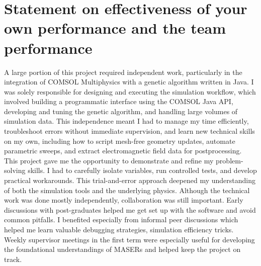 \chapter{
  Statement on effectiveness of your own performance and the team performance
}
A large portion of this project required independent work, particularly in the
integration of COMSOL Multiphysics with a genetic algorithm written in Java. I
was solely responsible for designing and executing the simulation workflow,
which involved building a programmatic interface using the COMSOL Java API,
developing and tuning the genetic algorithm, and handling large volumes of
simulation data. This independence meant I had to manage my time efficiently,
troubleshoot errors without immediate supervision, and learn new technical
skills on my own, including how to script mesh-free geometry updates, automate
parametric sweeps, and extract electromagnetic field data for postprocessing.
This project gave me the opportunity to demonstrate and refine my
problem-solving skills. I had to carefully isolate variables, run controlled
tests, and develop practical workarounds. This trial-and-error approach deepened
my understanding of both the simulation tools and the underlying physics.
Although the technical work was done mostly independently, collaboration was
still important. Early discussions with post-graduates helped me get set up with
the software and avoid common pitfalls. I benefited especially from informal
peer discussions which helped me learn valuable debugging strategies, simulation
efficiency tricks. Weekly supervisor meetings in the first term were especially
useful for developing the foundational understandings of MASERs and helped keep
the project on track.
